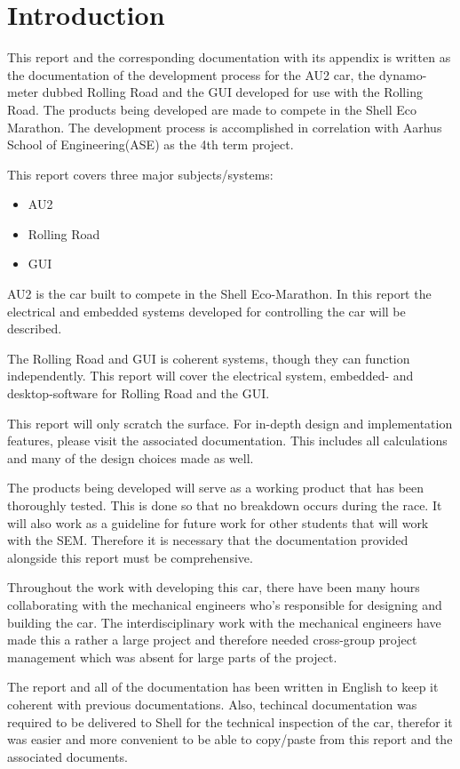 \chapter{Introduction}
This report and the corresponding documentation with its appendix is written as the documentation of the development process for the AU2 car, the dynamo-meter dubbed Rolling Road and the GUI developed for use with the Rolling Road. The products being developed are made to compete in the Shell Eco Marathon. The development process is accomplished in correlation with Aarhus School of Engineering(ASE) as the 4th term project.

This report covers three major subjects/systems:

\begin{itemize}
	\item{AU2}
	\item{Rolling Road}
	\item{GUI}
\end{itemize}

AU2 is the car built to compete in the Shell Eco-Marathon. In this report the electrical and embedded systems developed for controlling the car will be described. 

The Rolling Road and GUI is coherent systems, though they can function independently. This report will cover the electrical system, embedded- and desktop-software for Rolling Road and the GUI. 

This report will only scratch the surface. For in-depth design and implementation features, please visit the associated documentation. This includes all calculations and many of the design choices made as well.  

The products being developed will serve as a working product that has been thoroughly tested. This is done so that no breakdown occurs during the race. It will also work as a guideline for future work for other students that will work with the SEM. Therefore it is necessary that the documentation provided alongside this report must be comprehensive.

Throughout the work with developing this car, there have been many hours collaborating with the mechanical engineers who's responsible for designing and building the car. The interdisciplinary work with the mechanical engineers have made this a rather a large project and therefore needed cross-group project management which was absent for large parts of the project. 

The report and all of the documentation has been written in English to keep it coherent with previous documentations. Also, techincal documentation was required to be delivered to Shell for the technical inspection of the car, therefor it was easier and more convenient to be able to copy/paste from this report and the associated documents. 

